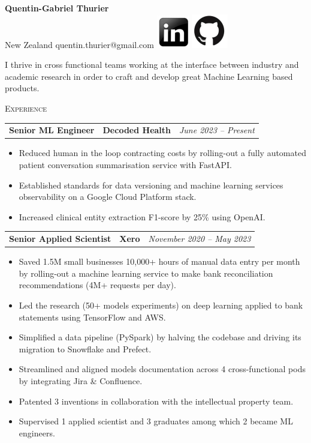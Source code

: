\documentclass[letterpaper,11pt]{article}
\renewcommand{\section}[1]{
  {\scshape\color{blue}#1}{\color{blue}\hrulefill}{\vspace{0.2cm}}
}
\newcommand{\resumeItem}[1]{
  \item\small{#1 \vspace{-6pt}}
}
\newcommand{\resumeItemListStart}{\begin{itemize}[label=$\circ$, topsep=0.2cm, leftmargin=0.6cm]}
\newcommand{\resumeItemListEnd}{\end{itemize}\vspace{8pt}}
\newcommand{\job}[4]{
    \begin{tabular}{p{7cm}p{6cm}p{5cm}}
      \hspace{-0.7em} \textbf{#1} & \textbf{\small{#2}} & \hfill \textit{\small{#4}}
    \end{tabular}
}
\begin{document}
 

\begin{center}
  \textbf{\Large Quentin-Gabriel Thurier} \\
  \small{New Zealand} \textbar{}
  \small{quentin.thurier@gmail.com} \textbar{}
  \href{https://www.linkedin.com/in/quentin-gabriel-thurier-36586021/}{\includegraphics[scale=0.6,valign=b]{linkedin}} \href{https://github.com/qthurier}{\includegraphics[scale=0.6, valign=b]{github}} 
\end{center}

I thrive in cross functional teams working at the interface between industry and academic research in order to craft and develop great Machine Learning based products. 

{\vspace{0.3cm}}

\section{Experience}

  \job {Senior ML Engineer}{Decoded Health}{Auckland}{June 2023 -- Present}
    \resumeItemListStart
      \resumeItem {Reduced human in the loop contracting costs by rolling-out a fully automated patient conversation summarisation service with FastAPI.}
      \resumeItem {Established standards for data versioning and machine learning services observability on a Google Cloud Platform stack.}
      \resumeItem {Increased clinical entity extraction F1-score by 25\% using OpenAI.}
    \resumeItemListEnd

	\job {Senior Applied Scientist}{Xero}{Auckland}{November 2020 -- May 2023}
      \resumeItemListStart
        \resumeItem {Saved 1.5M small businesses 10,000+ hours of manual data entry per month by rolling-out a machine learning service to make bank reconciliation recommendations (4M+ requests per day).}
        \resumeItem {Led the research (50+ models experiments) on deep learning applied to bank statements using TensorFlow and AWS.}
        \resumeItem {Simplified a data pipeline (PySpark) by halving the codebase and driving its migration to Snowflake and Prefect.}
        \resumeItem {Streamlined and aligned models documentation across 4 cross-functional pods by integrating Jira \& Confluence.}
        \resumeItem {Patented 3 inventions in collaboration with the intellectual property team.}
        \resumeItem {Supervised 1 applied scientist and 3 graduates among which 2 became ML engineers.}
      \resumeItemListEnd
\end{document}
